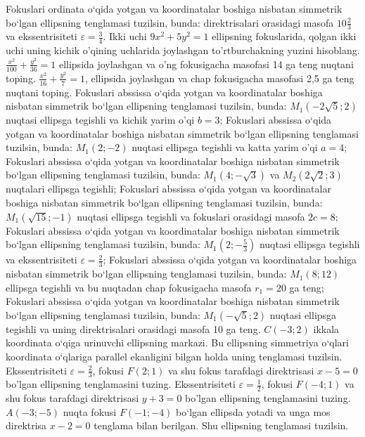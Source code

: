Fokuslari ordinata o‘qida yotgan va koordinatalar boshiga nisbatan simmetrik bo‘lgan ellipsning tenglamasi tuzilsin, bunda: direktrisalari orasidagi masofa $10 \frac{2}{3}$ va ekssentrisiteti $\varepsilon=\frac{3}{4}$.
Ikki uchi $9 x^2+5 y^2=1$ ellipsning fokuslarida, qolgan ikki uchi uning kichik o'qining uchlarida joylashgan to'rtburchakning yuzini hisoblang.
$\frac{x^2}{100}+\frac{y^2}{36}=1$ ellipsida joylashgan va o'ng fokusigacha masofasi 14 ga teng nuqtani toping.
$\frac{x^2}{16}+\frac{y^2}{7}=1$, ellipsida joylashgan va chap fokusigacha masofasi 2,5 ga teng nuqtani toping.
Fokuslari abssissa o‘qida yotgan va koordinatalar boshiga nisbatan simmetrik bo‘lgan ellipsning tenglamasi tuzilsin, bunda: $M_1(-2 \sqrt{5} ; 2)$ nuqtasi ellipsga tegishli va kichik yarim o'qi $b=3$;
Fokuslari abssissa o‘qida yotgan va koordinatalar boshiga nisbatan simmetrik bo‘lgan ellipsning tenglamasi tuzilsin, bunda: $M_1(2 ;-2)$ nuqtasi ellipsga tegishli va katta yarim o'qi $a=4$;
Fokuslari abssissa o‘qida yotgan va koordinatalar boshiga nisbatan simmetrik bo‘lgan ellipsning tenglamasi tuzilsin, bunda: $M_1(4 ;-\sqrt{3})$ va $M_2(2 \sqrt{2} ; 3)$ nuqtalari ellipsga tegishli;
Fokuslari abssissa o‘qida yotgan va koordinatalar boshiga nisbatan simmetrik bo‘lgan ellipsning tenglamasi tuzilsin, bunda: $M_1(\sqrt{15} ;-1)$ nuqtasi ellipsga tegishli va fokuslari orasidagi masofa $2 c=8$;
Fokuslari abssissa o‘qida yotgan va koordinatalar boshiga nisbatan simmetrik bo‘lgan ellipsning tenglamasi tuzilsin, bunda: $M_1\left(2 ;-\frac{5}{3}\right)$ nuqtasi ellipsga tegishli va ekssentrisiteti $\varepsilon=\frac{2}{3}$;
Fokuslari abssissa o‘qida yotgan va koordinatalar boshiga nisbatan simmetrik bo‘lgan ellipsning tenglamasi tuzilsin, bunda: $M_1(8 ; 12)$ ellipsga tegishli va bu nuqtadan chap fokusigacha masofa $r_1=20$ ga teng;
Fokuslari abssissa o‘qida yotgan va koordinatalar boshiga nisbatan simmetrik bo‘lgan ellipsning tenglamasi tuzilsin, bunda: $M_1 (-\sqrt{5}; 2) $ nuqtasi ellipsga tegishli va uning direktrisalari orasidagi masofa 10 ga teng.
$C (-3; 2) $ ikkala koordinata o‘qiga urinuvchi ellipsning markazi. Bu ellipsning simmetriya o‘qlari koordinata o‘qlariga parallel ekanligini bilgan holda uning tenglamasi tuzilsin.
Ekssentrisiteti $\varepsilon=\frac{2}{3}$, fokusi $F(2 ; 1)$ va shu fokus tarafdagi direktrisasi $x-5=0$ bo'lgan ellipsning tenglamasini tuzing.
Ekssentrisiteti $\varepsilon=\frac{1}{2}$, fokusi $F(-4 ; 1)$ va shu fokus tarafdagi direktrisasi $y+3=0$ bo'lgan ellipsning tenglamasini tuzing.
$A (-3;-5)$ nuqta fokusi $F (-1;-4)$ bo‘lgan ellipsda yotadi va unga mos direktrisa $x-2=0$ tenglama bilan berilgan. Shu ellipsning tenglamasi tuzilsin.
